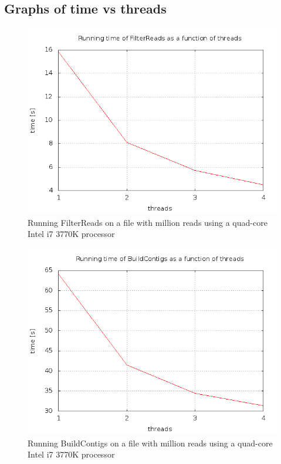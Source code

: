 \documentclass[a4paper]{report}
\begin{document}
\subsection{Graphs of time vs threads}

\begin{figure}
\hspace*{-50pt}\includegraphics[scale=0.4]{graphs/threadtime_filter1.png}
\caption{Running FilterReads on a file with million reads using a quad-core Intel i7 3770K processor}
\label{filtertime1}
\end{figure}

\begin{figure}
\hspace*{-50pt}\includegraphics[scale=0.4]{graphs/threadtime_contigs1.png}
\caption{Running BuildContigs on a file with million reads using a quad-core Intel i7 3770K processor}
\label{contigtime1}
\end{figure}
\end{document}
